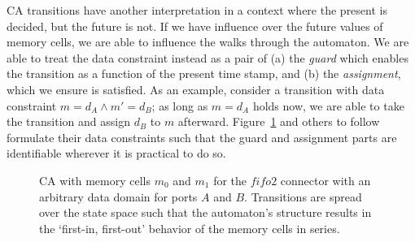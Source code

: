 CA transitions have another interpretation in a context where the present is decided, but the future is not. If we have influence over the future values of memory cells, we are able to influence the walks through the automaton. We are able to treat the data constraint instead as a pair of (a) the \textit{guard} which enables the transition as a function of the present time stamp, and (b) the \textit{assignment}, which we ensure is satisfied. As an example, consider a transition with data constraint $m=d_A\wedge{m'=d_B}$; as long as $m=d_A$ holds now, we are able to take the transition and assign $d_B$ to $m$ afterward.  
Figure~\ref{fig:fifo2_ca} and others to follow formulate their data constraints such that the guard and assignment parts are identifiable wherever it is practical to do so.


\begin{figure}[ht]
	\centering
	\caption[CA with memory for fifo2 connector.]{CA with memory cells $m_0$ and $m_1$ for the $fifo2$ connector with an arbitrary data domain for ports $A$ and $B$. Transitions are spread over the state space such that the automaton's structure results in the `first-in, first-out' behavior of the memory cells in series.}
	\label{fig:fifo2_ca}
\end{figure}


